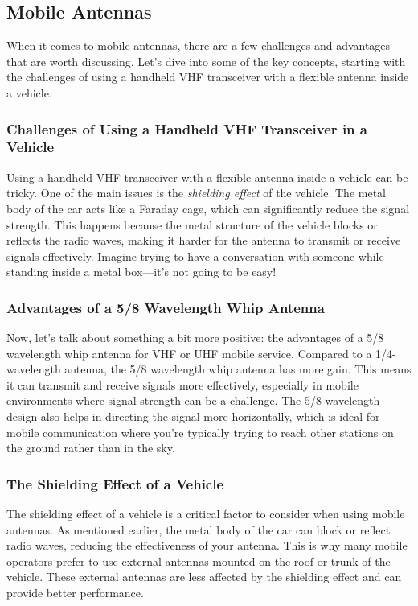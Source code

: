 \subsection{Mobile Antennas}
\label{subsec:mobile}

When it comes to mobile antennas, there are a few challenges and advantages that are worth discussing. Let's dive into some of the key concepts, starting with the challenges of using a handheld VHF transceiver with a flexible antenna inside a vehicle.

\subsubsection*{Challenges of Using a Handheld VHF Transceiver in a Vehicle}
Using a handheld VHF transceiver with a flexible antenna inside a vehicle can be tricky. One of the main issues is the \textit{shielding effect} of the vehicle. The metal body of the car acts like a Faraday cage, which can significantly reduce the signal strength. This happens because the metal structure of the vehicle blocks or reflects the radio waves, making it harder for the antenna to transmit or receive signals effectively. Imagine trying to have a conversation with someone while standing inside a metal box—it's not going to be easy!

\subsubsection*{Advantages of a 5/8 Wavelength Whip Antenna}
Now, let's talk about something a bit more positive: the advantages of a 5/8 wavelength whip antenna for VHF or UHF mobile service. Compared to a 1/4-wavelength antenna, the 5/8 wavelength whip antenna has more gain. This means it can transmit and receive signals more effectively, especially in mobile environments where signal strength can be a challenge. The 5/8 wavelength design also helps in directing the signal more horizontally, which is ideal for mobile communication where you're typically trying to reach other stations on the ground rather than in the sky.

\subsubsection*{The Shielding Effect of a Vehicle}
The shielding effect of a vehicle is a critical factor to consider when using mobile antennas. As mentioned earlier, the metal body of the car can block or reflect radio waves, reducing the effectiveness of your antenna. This is why many mobile operators prefer to use external antennas mounted on the roof or trunk of the vehicle. These external antennas are less affected by the shielding effect and can provide better performance.

